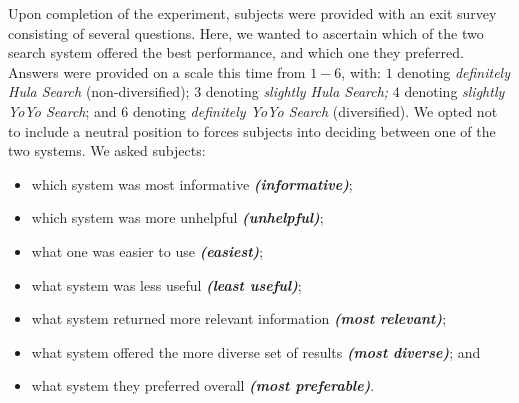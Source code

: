 Upon completion of the experiment, subjects were provided with an exit survey consisting of several questions. Here, we wanted to ascertain which of the two search system offered the best performance, and which one they preferred. Answers were provided on a scale this time from $1-6$, with: $1$ denoting \emph{definitely Hula Search} (non-diversified); $3$ denoting \emph{slightly Hula Search;} $4$ denoting \emph{slightly YoYo Search}; and $6$ denoting \emph{definitely YoYo Search} (diversified). We opted not to include a neutral position to forces subjects into deciding between one of the two systems. We asked subjects:

\begin{itemize}
    \item{which system was most informative \emph{\textbf{(informative)}};}
    \item{which system was more unhelpful \emph{\textbf{(unhelpful)}};}
    \item{what one was easier to use \emph{\textbf{(easiest)}};}
    \item{what system was less useful \emph{\textbf{(least useful)}};}
    \item{what system returned more relevant information \emph{\textbf{(most relevant)}};}
    \item{what system offered the more diverse set of results \emph{\textbf{(most diverse)}}; and}
    \item{what system they preferred overall \emph{\textbf{(most preferable)}}.}
\end{itemize}


